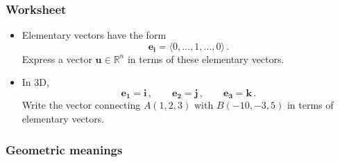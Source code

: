 \documentclass[aspectratio=169]{beamer}
\newcommand{\vect}{\mathbf}
\begin{document}
\begin{frame}
    \frametitle{Worksheet}
    \begin{itemize}
        \item Elementary vectors have the form
    $$ \vect{e_i} = \langle 0, \dots, 1,  \dots, 0\rangle \,.$$
    Express a vector $\vect{u} \in \mathbb{R}^n$ in terms of these elementary vectors.
        \item In 3D,
    \begin{equation*}
        \vect{e_1} = \vect{i} \,, \qquad 
        \vect{e_2} = \vect{j} \,, \qquad
        \vect{e_3} = \vect{k} \,.
    \end{equation*}
    Write the vector connecting $A(1,2,3)$ with $B(-10,-3,5)$ in terms of elementary vectors.
    \end{itemize}
\end{frame}

\begin{frame}
    \frametitle{Geometric meanings}
\end{frame}
\end{document}
